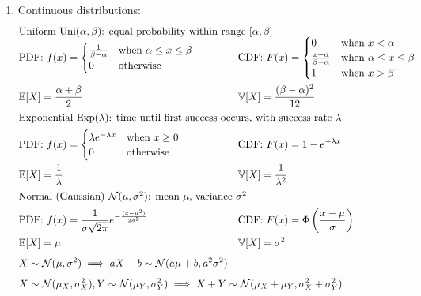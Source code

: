 \documentclass{article}
\begin{document}
\begin{enumerate}
	\item Continuous distributions:
		\vspace*{-\baselineskip}
		\begin{align*}
			\intertext{Uniform $\mathrm{Uni}(\alpha,\beta)$: equal probability within range $[\alpha,\beta]$\vspace*{-0.5\baselineskip}}
			&\text{PDF: }f(x)=\begin{cases}
				\frac{1}{\beta-\alpha} &\text{when $\alpha\leq x\leq\beta$} \\
				0 &\text{otherwise}
			\end{cases} &&\hspace*{-3.9cm}\text{CDF: }F(x)=\begin{cases}
				0 &\text{when $x<\alpha$} \\
				\frac{x-\alpha}{\beta-\alpha} &\text{when $\alpha\leq x\leq\beta$} \\
				1 &\text{when $x>\beta$}
			\end{cases} \\
			&\mathbb{E}[X]=\frac{\alpha+\beta}{2} &&\hspace*{-3.9cm}\mathbb{V}[X]=\frac{(\beta-\alpha)^2}{12} \\
			\intertext{Exponential $\mathrm{Exp}(\lambda)$: time until first success occurs, with success rate $\lambda$}
			&\text{PDF: }f(x)=\begin{cases}
				\lambda e^{-\lambda x} &\text{when $x\geq0$} \\
				0 &\text{otherwise}
			\end{cases} &&\hspace*{-3.9cm}\text{CDF: }F(x)=1-e^{-\lambda x} \\
			&\mathbb{E}[X]=\frac{1}{\lambda} &&\hspace*{-3.9cm}\mathbb{V}[X]=\frac{1}{\lambda^2} \\
			\intertext{Normal (Gaussian) $\mathcal{N}(\mu,\sigma^2)$: mean $\mu$, variance $\sigma^2$}
			&\text{PDF: }f(x)=\frac{1}{\sigma\sqrt{2\pi}}e^{-\frac{(x-\mu^2)}{2\sigma^2}}&&\hspace*{-3.9cm}\text{CDF: }F(x)=\Phi\left(\frac{x-\mu}{\sigma}\right) \\
			&\mathbb{E}[X]=\mu &&\hspace*{-3.9cm}\mathbb{V}[X]=\sigma^2 \\[0.25\baselineskip]
			&X\sim\mathcal{N}(\mu,\sigma^2)\implies aX+b\sim\mathcal{N}(a\mu+b,a^2\sigma^2) \\[0.25\baselineskip]
			&X\sim\mathcal{N}(\mu_X,\sigma_X^2),Y\sim\mathcal{N}(\mu_Y,\sigma_Y^2)\implies X+Y\sim\mathcal{N}(\mu_X+\mu_Y,\sigma_X^2+\sigma_Y^2)
		\end{align*}
		

\end{enumerate}
\end{document}
